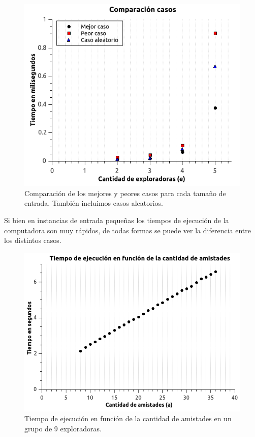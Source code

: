 \begin{itemize}
\begin{figure}[H] 
\begin{center}

  \includegraphics[width=\linewidth]{../graficos/ej3/ComparacionCasosZoom.png}
  \caption{{\small Comparación de los mejores y peores casos para cada tamaño de entrada. También incluimos casos aleatorios.}} \label{asd}
\endminipage

\end{center}
\end{figure}

Si bien en instancias de entrada pequeñas los tiempos de ejecución de la computadora son muy rápidos, de todas formas se puede ver la diferencia entre los distintos casos.

\begin{figure}[H] 
\begin{center}

  \includegraphics[width=\linewidth]{../graficos/ej3/CantidadAmistades.png}
  \caption{{\small Tiempo de ejecución en función de la cantidad de amistades en un grupo de 9 exploradoras.}} \label{asd}
\endminipage


\end{center}
\end{figure}
\end{itemize}

